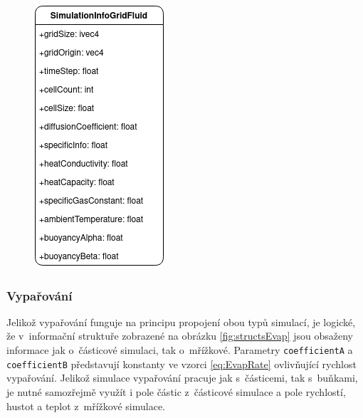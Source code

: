 \begin{figure}[hbt]
	\centering
	\captionsetup{justification=centering}
	\includegraphics[scale=0.6]{obrazky-figures/SimulationInfoGridFluid.png}
	\label{fig:structsGrid}
\end{figure}

\subsubsection{Vypařování}
Jelikož vypařování funguje na principu propojení obou typů simulací, je logické, že v~informační struktuře zobrazené na obrázku \ref{fig:structsEvap} jsou obsaženy informace jak o~částicové simulaci, tak o~mřížkové. Parametry \texttt{coefficientA} a \texttt{coefficientB} představují konstanty ve vzorci \ref{eq:EvapRate} ovlivňující rychlost vypařování. Jelikož simulace vypařování pracuje jak s~částicemi, tak s~buňkami, je nutné samozřejmě využít i pole částic z~částicové simulace a pole rychlostí, hustot a teplot z~mřížkové simulace.

